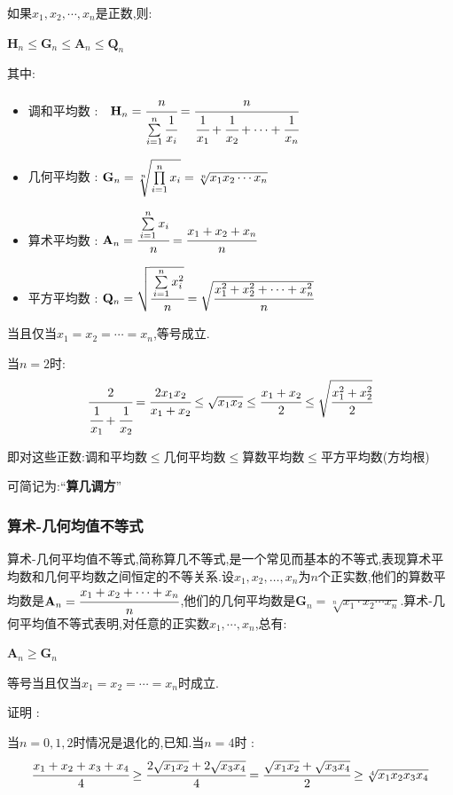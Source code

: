 {{{如果$x_{1},x_{2},\dotsm,x_{n}$是正数,则:

$\mathbf{H}_n \leq \mathbf{G}_n \leq \mathbf{A}_n \leq \mathbf{Q}_n$

其中:

\begin{itemize}
    \item 调和平均数 :　$\mathbf{H}_n = \cfrac{n}{\upDownSum{n}{i = 1}\cfrac{1}{x_i}} = \cfrac{n}{\cfrac{1}{x_1} + \cfrac{1}{x_2} + \dotsm + \cfrac{1}{x_n}}$
    \item 几何平均数 : $\mathbf{G}_n = \sqrt[n]{\upDownProd{n}{i = 1}x_i} = \sqrt[n]{x_1x_2\dotsm x_n}$
    \item 算术平均数 : $\mathbf{A}_n = \cfrac{\upDownSum{n}{i = 1}x_i}{n} = \cfrac{x_1 + x_2 + x_n}{n}$
    \item 平方平均数 : $\mathbf{Q}_n = \sqrt{\cfrac{\upDownSum{n}{i = 1}x^2_i}{n}} = \sqrt{\cfrac{x^2_1 + x^2_2 + \dotsm + x^2_n}{n}}$
\end{itemize}

当且仅当$x_1 = x_2 = \dotsm = x_n$,等号成立.

当$n = 2$时:$$
    \cfrac{2}{\cfrac{1}{x_1} + \cfrac{1}{x_2}} = \cfrac{2x_1x_2}{x_1 + x_2}\leq\sqrt{x_1x_2}\leq\cfrac{x_1 + x_2}{2}\leq\sqrt{\cfrac{x_1^2 + x_2^2}{2}}
$$

即对这些正数:调和平均数$\leq$几何平均数$\leq$算数平均数$\leq$平方平均数(方均根)

可简记为:“{\bfseries 算几调方}”
}%

\subsubsection{算术-几何均值不等式}{
    算术-几何平均值不等式,简称算几不等式,是一个常见而基本的不等式,表现算术平均数和几何平均数之间恒定的不等关系.设$x_1,x_2,\dots,x_n$为$n$个正实数,他们的算数平均数是$\mathbf{A}_n = \cfrac{x_1 + x_2 + \dotsm + x_n}{n}$,他们的几何平均数是$\mathbf{G}_n = \sqrt[n]{x_1\cdot x_2 \dotsm x_n}$.算术-几何平均值不等式表明,对任意的正实数$x_1,\dotsm,x_n$,总有:

    \begin{center}
        $\mathbf{A}_n\geq\mathbf{G}_n$
    \end{center}

    等号当且仅当$x_1 = x_2 = \dotsm = x_n$时成立.

    证明 :

    当$n = 0,1,2$时情况是退化的,已知.当$n = 4$时 : $$
        \cfrac{x_1 + x_2 + x_3 + x_4}{4} \geq \cfrac{2\sqrt{x_1x_2} + 2\sqrt{x_3x_4}}{4} = \cfrac{\sqrt{x_1x_2} + \sqrt{x_3x_4}}{2} \geq \sqrt[4]{x_1x_2x_3x_4}
    $$

}}}
